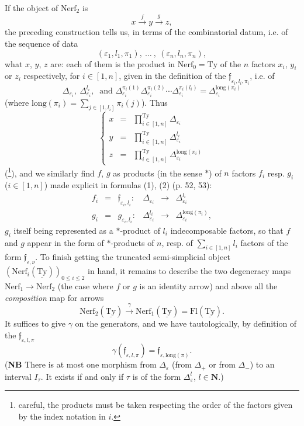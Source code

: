 \documentclass[11pt]{article}
\newcommand{\printedpage}[1]{\marginpar{\footnotesize p.~#1}}
\newcommand{\msp}[1]{\marginpar{\footnotesize [#1]}}
\newcommand{\uTy}{\underline{\mathrm{Ty}}}
\begin{document}
\printedpage{37}
\msp{page 54}
If the object of $\mathrm{Nerf}_2$ is
\[
x\xrightarrow{\ f\ }y\xrightarrow{\ g\ }z,
\]
the preceding construction tells us, in terms of the combinatorial datum, i.e. of the sequence of data
\[
(\varepsilon_1,l_1,\pi_1),\ \dots\ ,\ (\varepsilon_n,l_n,\pi_n),
\]
what $x$, $y$, $z$ are: each of them is the product in $\mathrm{Nerf}_0=\mathrm{Ty}$ of the $n$ factors $x_i$, $y_i$ or $z_i$ respectively, for $i\in[1,n]$, given in the definition of the $\mathfrak{f}_{\varepsilon_i,l_i,\pi_i}$, i.e. of
\[
\Delta_{\varepsilon_i},\ \Delta^{l_i}_{\varepsilon_i},\ \text{ and }\Delta^{\pi_i(1)}_{\varepsilon_i}\Delta^{\pi_i(2)}_{\varepsilon_i}\cdots\Delta^{\pi_i(l_i)}_{\varepsilon_i}=\Delta^{\mathrm{long}(\pi_i)}_{\varepsilon_i}
\]
(where $\mathrm{long}(\pi_i)=\sum_{j\in[1,l_i]}\pi_i(j)$). Thus
\[
\left\{
\begin{array}{lcl}
x & = & \prod^{\mathrm{Ty}}_{i\in[1,n]}\Delta_{\varepsilon_i}\\[4pt]
y & = & \prod^{\mathrm{Ty}}_{i\in[1,n]}\Delta^{l_i}_{\varepsilon_i}\\[4pt]
z & = & \prod^{\mathrm{Ty}}_{i\in[1,n]}\Delta^{\mathrm{long}(\pi_i)}_{\varepsilon_i}
\end{array}
\right.
\]
(\footnote[16]{careful, the products must be taken respecting the order of the factors given by the index notation in $i$.}), and we similarly find $f$, $g$ as products (in the sense $*$) of $n$ factors $f_i$ resp. $g_i$ ($i\in[1,n]$) made explicit in formulas (1), (2) (p. 52, 53):
\[
\begin{array}{lclccl}
f_i & = & \mathfrak{f}_{\varepsilon_i,l_i} : & \Delta_{\varepsilon_i} & \longrightarrow & \Delta^{l_i}_{\varepsilon_i}\\[4pt]
g_i & = & g_{\varepsilon_i,l_i} : & \Delta^{l_i}_{\varepsilon_i} & \longrightarrow & \Delta^{\mathrm{long}(\pi_i)}_{\varepsilon_i}, %
\end{array}
\]
$g_i$ itself being represented as a $*$-product of $l_i$ indecomposable factors, so that $f$ and $g$ appear in the form
\msp{page 55}
of $*$-products of $n$, resp. of $\sum_{i\in[1,n]}l_i$ factors of the form $\mathfrak{f}_{\varepsilon,\nu}$. To finish getting the truncated semi-simplicial object $(\mathrm{Nerf}_i(\uTy))_{0\leq i\leq 2}$ in hand, it remains to describe the two degeneracy maps $\mathrm{Nerf}_1\longrightarrow\mathrm{Nerf}_2$ (the case where $f$ or $g$ is an identity arrow) and above all the \textit{composition} map for arrows
\[
\mathrm{Nerf}_2(\uTy)\xrightarrow{\ \gamma\ }\mathrm{Nerf}_1(\uTy)=\mathrm{Fl}(\uTy).
\]
It suffices to give $\gamma$ on the generators, and we have tautologically, by definition of the $\mathfrak{f}_{\varepsilon,l,\pi}$
\[
\gamma(\mathfrak{f}_{\varepsilon,l,\pi})=\mathfrak{f}_{\varepsilon,\mathrm{long}(\pi)}.
\]
(\textbf{NB} There is at most one morphism from $\Delta_\varepsilon$ (from $\Delta_+$ or from $\Delta_-$) to an interval $I_\tau$. It exists if and only if $\tau$ is of the form $\Delta^l_\varepsilon$, $l\in\mathbf{N}$.)
\end{document}
